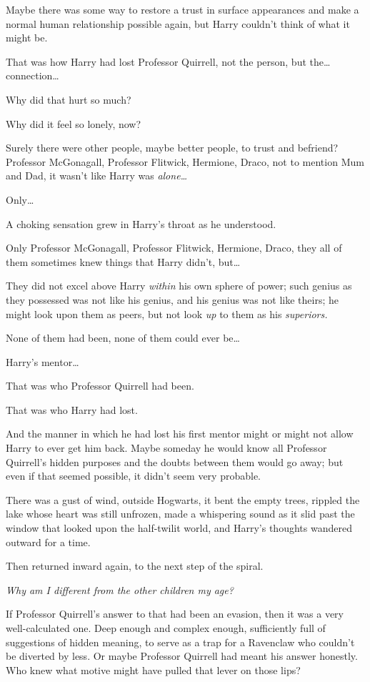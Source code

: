 Maybe there was some way to restore a trust in surface appearances and make a 
normal human relationship possible again, but Harry couldn't think of what it 
might be.

That was how Harry had lost Professor Quirrell, not the person, but the{\ldots} 
connection{\ldots}

Why did that hurt so much?

Why did it feel so lonely, now?

Surely there were other people, maybe better people, to trust and befriend? 
Professor McGonagall, Professor Flitwick, Hermione, Draco, not to mention Mum 
and Dad, it wasn't like Harry was \emph{alone{\ldots}}

Only{\ldots}

A choking sensation grew in Harry's throat as he understood.

Only Professor McGonagall, Professor Flitwick, Hermione, Draco, they all of 
them sometimes knew things that Harry didn't, but{\ldots}

They did not excel above Harry \emph{within} his own sphere of power; such 
genius as they possessed was not like his genius, and his genius was not like 
theirs; he might look upon them as peers, but not look \emph{up} to them as his 
\emph{superiors.}

None of them had been, none of them could ever be{\ldots}

Harry's mentor{\ldots}

That was who Professor Quirrell had been.

That was who Harry had lost.

And the manner in which he had lost his first mentor might or might not allow 
Harry to ever get him back. Maybe someday he would know all Professor 
Quirrell's hidden purposes and the doubts between them would go away; but even 
if that seemed possible, it didn't seem very probable.

There was a gust of wind, outside Hogwarts, it bent the empty trees, rippled 
the lake whose heart was still unfrozen, made a whispering sound as it slid 
past the window that looked upon the half-twilit world, and Harry's thoughts 
wandered outward for a time.

Then returned inward again, to the next step of the spiral.

\emph{Why am I different from the other children my age?}

If Professor Quirrell's answer to that had been an evasion, then it was a very 
well-calculated one. Deep enough and complex enough, sufficiently full of 
suggestions of hidden meaning, to serve as a trap for a Ravenclaw who couldn't 
be diverted by less. Or maybe Professor Quirrell had meant his answer honestly. 
Who knew what motive might have pulled that lever on those lips?

